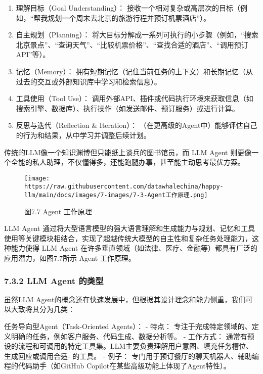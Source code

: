 \documentclass[
]{article}
\providecommand{\tightlist}{%
  \setlength{\itemsep}{0pt}\setlength{\parskip}{0pt}}
\begin{document}
\begin{enumerate}
\def\labelenumi{\arabic{enumi}.}
\tightlist
\item
  理解目标（Goal Understanding）：
  接收一个相对复杂或高层次的目标（例如，``帮我规划一个周末去北京的旅游行程并预订机票酒店''）。
\item
  自主规划（Planning）：
  将大目标分解成一系列可执行的小步骤（例如，``搜索北京景点''、``查询天气''、``比较机票价格''、``查找合适的酒店''、``调用预订API''等）。
\item
  记忆（Memory）：
  拥有短期记忆（记住当前任务的上下文）和长期记忆（从过去的交互或外部知识库中学习和检索信息）。
\item
  工具使用（Tool Use）：
  调用外部API、插件或代码执行环境来获取信息（如搜索引擎、数据库）、执行操作（如发送邮件、预订服务）或进行计算。
\item
  反思与迭代（Reflection \& Iteration）：
  （在更高级的Agent中）能够评估自己的行为和结果，从中学习并调整后续计划。
\end{enumerate}

传统的LLM像一个知识渊博但只能纸上谈兵的图书馆员，而 LLM Agent
则更像一个全能的私人助理，不仅懂得多，还能跑腿办事，甚至能主动思考最优方案。

\begin{figure}[htbp]\centering
\texttt{[image: https://raw.githubusercontent.com/datawhalechina/happy-llm/main/docs/images/7-images/7-3-Agent工作原理.png]}
\caption{图7.7 Agent 工作原理}
\end{figure}

LLM Agent
通过将大型语言模型的强大语言理解和生成能力与规划、记忆和工具使用等关键模块相结合，实现了超越传统大模型的自主性和复杂任务处理能力，这种能力使得
LLM Agent
在许多垂直领域（如法律、医疗、金融等）都具有广泛的应用潜力，如图7.7所示
Agent 工作原理。

\subsubsection{7.3.2 LLM Agent
的类型}\label{llm-agent-ux7684ux7c7bux578b}

虽然LLM
Agent的概念还在快速发展中，但根据其设计理念和能力侧重，我们可以大致将其分为几类：

任务导向型Agent（Task-Oriented Agents）： - 特点：
专注于完成特定领域的、定义明确的任务，例如客户服务、代码生成、数据分析等。
- 工作方式：
通常有预设的流程和可调用的特定工具集。LLM主要负责理解用户意图、填充任务槽位、生成回应或调用合适-
的工具。 - 例子：
专门用于预订餐厅的聊天机器人、辅助编程的代码助手（如GitHub
Copilot在某些高级功能上体现了Agent特性）。
\end{document}
